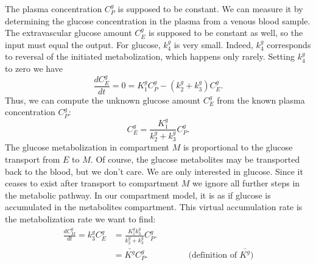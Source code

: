 \documentclass[11pt,oneside]{book}
\begin{document}
The plasma concentration $C_P^g$ is supposed to be constant. We can
measure it by determining the glucose concentration in the plasma from
a venous blood sample. The extravascular glucose amount $C_E^g$ is
supposed to be constant as well, so the input must equal the
output. For glucose, $k_4^g$ is very small. Indeed, $k_4^g$
corresponds to reversal of the initiated metabolization, which happens
only rarely. Setting $k_4^g$ to zero we have
\begin{equation}
\frac{d C_E^g}{dt} = 0 = K_1^g C_P^g - (k_2^g + k_3^g) C_E^g.
\end{equation}
Thus, we can compute the unknown glucose amount $C_E^g$ from the known plasma
concentration $C_P^g$:
\begin{equation}
  C_E^g = \frac{K_1^g}{k_2^g + k_3^g} C_P^g.
\end{equation}
The glucose metabolization in compartment $M$ is proportional to the glucose
transport from $E$ to $M$. Of course, the glucose metabolites may be
transported back to the blood, but we don't care. We are only interested in
glucose. Since it ceases to exist after transport to compartment $M$ we ignore
all further steps in the metabolic pathway. In our compartment model, it is as
if glucose is accumulated in the metabolites compartment. This virtual
accumulation rate is the metabolization rate we want to find:
\begin{align}
  \frac{d C_M^g}{d t} = k_3^g C_E^g &= 
   \frac{K_1^g k_3^g}{k_2^g + k_3^g} C_P^g.\\
  &= \bar{K^g}  C_P^g. \hspace{2cm} \mbox{$($definition of } \bar{K^g})
\end{align}
\end{document}
